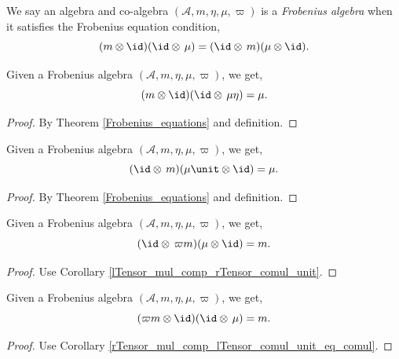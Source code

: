  \begin{definition}\label{FrobeniusAlgebra}\leanok
  We say an algebra and co-algebra $(\mathcal{A},m,\eta,\mu,\varpi)$ is a \textit{Frobenius algebra} when it satisfies the Frobenius equation condition,
  \[(m\otimes\id)(\id\otimes\,\mu)=(\id\otimes\,m)(\mu\otimes\id).\]
 \end{definition}

 \begin{corollary}\label{rTensor_mul_comp_lTensor_comul_unit_eq_comul}
  \leanok
  Given a Frobenius algebra $(\mathcal{A},m,\eta,\mu,\varpi)$, we get,
  \[(m\otimes\id)(\id\otimes\,\mu\eta)=\mu.\]
 \end{corollary}
 \begin{proof}\leanok
  By Theorem \ref{Frobenius_equations} and definition.
 \end{proof}

 \begin{corollary}\label{lTensor_mul_comp_rTensor_comul_unit}
  \leanok
  Given a Frobenius algebra $(\mathcal{A},m,\eta,\mu,\varpi)$, we get,
  \[(\id\otimes\,m)(\mu\unit\otimes\id)=\mu.\]
 \end{corollary}
 \begin{proof}\leanok
  By Theorem \ref{Frobenius_equations} and definition.
 \end{proof}

 \begin{corollary}\label{lTensor_counit_mul_comp_rTensor_comul}
  \leanok
  Given a Frobenius algebra $(\mathcal{A},m,\eta,\mu,\varpi)$, we get,
  \[(\id\otimes\,\varpi m)(\mu\otimes\id)=m.\]
 \end{corollary}
 \begin{proof}\leanok
  Use Corollary \ref{lTensor_mul_comp_rTensor_comul_unit}.
 \end{proof}
 \begin{corollary}\label{rTensor_counit_mul_comp_lTensor_comul}
  \leanok
  Given a Frobenius algebra $(\mathcal{A},m,\eta,\mu,\varpi)$, we get,
  \[(\varpi m\otimes\id)(\id\otimes\,\mu)=m.\]
 \end{corollary}
 \begin{proof}\leanok
  Use Corollary \ref{rTensor_mul_comp_lTensor_comul_unit_eq_comul}.
 \end{proof}

